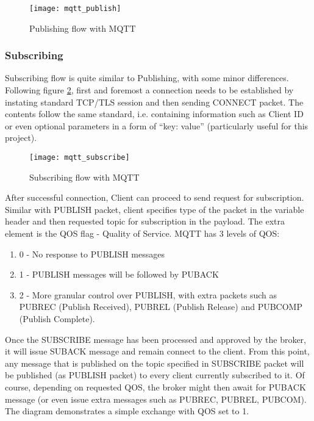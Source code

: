 \begin{figure}[ht]
    \centering
    \texttt{[image: mqtt\_publish]}
    \caption{Publishing flow with MQTT}
    \label{fig:mqtt_publish}
\end{figure}


\subsubsection{\textbf{Subscribing}}

Subscribing flow is quite similar to Publishing, with some minor differences. Following figure \ref{fig:mqtt_subscribe}, first and foremost a connection needs to be established by instating standard TCP/TLS session and then sending CONNECT packet. The contents follow the same standard, i.e. containing information such as Client ID or even optional parameters in a form of ``key: value'' (particularly useful for this project).

\begin{figure}[ht]
    \centering
    \texttt{[image: mqtt\_subscribe]}
    \caption{Subscribing flow with MQTT}
    \label{fig:mqtt_subscribe}
\end{figure}

After successful connection, Client can proceed to send request for subscription. Similar with PUBLISH packet, client specifies type of the packet in the variable header and then requested topic for subscription in the payload. The extra element is the QOS flag - Quality of Service. MQTT has 3 levels of QOS:
\begin{enumerate}
  \item 0 - No response to PUBLISH messages
  \item 1 - PUBLISH messages will be followed by PUBACK
  \item 2 - More granular control over PUBLISH, with extra packets such as PUBREC (Publish Received), PUBREL (Publish Release) and PUBCOMP (Publish Complete).
\end{enumerate}

Once the SUBSCRIBE message has been processed and approved by the broker, it will issue SUBACK message and remain connect to the client. From this point, any message that is published on the topic specified in SUBSCRIBE packet will be published (as PUBLISH packet) to every client currently subscribed to it. Of course, depending on requested QOS, the broker might then await for PUBACK message (or even issue extra messages such as PUBREC, PUBREL, PUBCOM). The diagram demonstrates a simple exchange with QOS set to 1. 

